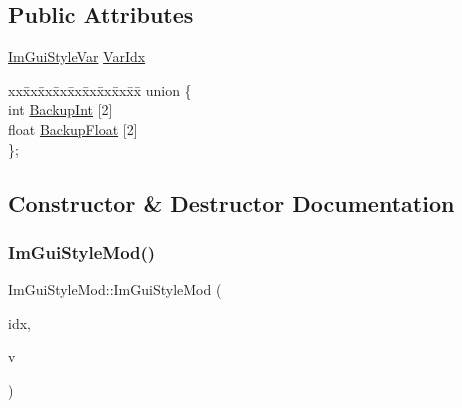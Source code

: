 \subsection*{Public Attributes}
\begin{DoxyCompactItemize}
\item 
\mbox{\hyperlink{imgui_8h_ac919acabce24faae590e295b424874ca}{Im\+Gui\+Style\+Var}} \mbox{\hyperlink{struct_im_gui_style_mod_ab23c55941dbd0e156ce640a8fecb2feb}{Var\+Idx}}
\item 
\begin{tabbing}
xx\=xx\=xx\=xx\=xx\=xx\=xx\=xx\=xx\=\kill
union \{\\
\>int \mbox{\hyperlink{struct_im_gui_style_mod_a60491c95989b2a866ebb76403a562f6f}{BackupInt}} \mbox{[}2\mbox{]}\\
\>float \mbox{\hyperlink{struct_im_gui_style_mod_af36b5cf1100de970d78a53db937be949}{BackupFloat}} \mbox{[}2\mbox{]}\\
\}; \\

\end{tabbing}\end{DoxyCompactItemize}


\subsection{Constructor \& Destructor Documentation}
\mbox{\label{struct_im_gui_style_mod_ae9987273b247f021020034256364bec8}} 
\subsubsection{\texorpdfstring{Im\+Gui\+Style\+Mod()}{ImGuiStyleMod()}\hspace{0.1cm}{\footnotesize\ttfamily [1/3]}}
{\footnotesize\ttfamily Im\+Gui\+Style\+Mod\+::\+Im\+Gui\+Style\+Mod (\begin{DoxyParamCaption}\item[{\mbox{\hyperlink{imgui_8h_ac919acabce24faae590e295b424874ca}{Im\+Gui\+Style\+Var}}}]{idx,  }\item[{int}]{v }\end{DoxyParamCaption})\hspace{0.3cm}{\ttfamily [inline]}}

\mbox{\label{struct_im_gui_style_mod_a737c3fad802a8d5d4616f9decc7e402d}} 
